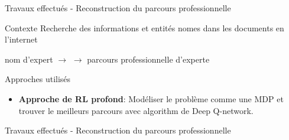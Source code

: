 \documentclass{beamer}
\begin{document}
{{%
%
%
%
%



\begin{frame}{Travaux effectués - Reconstruction du parcours professionnelle}
\begin{block}{Contexte}
Recherche des informations et entités nomes dans les documents en l'internet 
\begin{center}
 nom d'expert $\longrightarrow$  $\longrightarrow$ parcours professionnelle d'experte  
\end{center}
\end{block}

\begin{block}{Approches utilisés}
\begin{itemize}
\item \textbf{Approche de RL profond}: Modéliser le problème comme une MDP et trouver le meilleurs parcours avec  algorithm de Deep Q-network.  
\end{itemize}
\end{block}
\end{frame}


\begin{frame}{Travaux effectués - Reconstruction du parcours professionnelle}


\end{frame}}}
\end{document}
